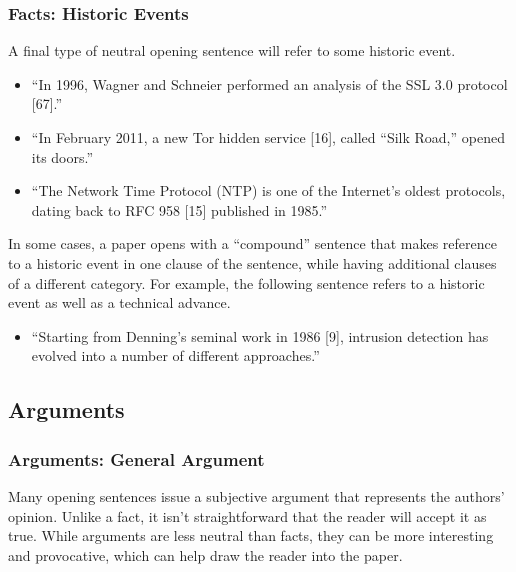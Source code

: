 \documentclass[sigconf,anonymous]{acmart}
\begin{document}
	\subsubsection{Facts: Historic Events}
	
	A final type of neutral opening sentence will refer to some historic event. 
	\begin{itemize} 		
		\item	``In 1996, Wagner and Schneier performed an analysis of the SSL 3.0 protocol [67].''
		
		\item	``In February 2011, a new Tor hidden service [16], called “Silk Road,” opened its doors.''
		
		\item	``The Network Time Protocol (NTP) is one of the Internet’s oldest protocols, dating back to RFC 958 [15] published in 1985.''
	\end{itemize} 		
	In some cases, a paper opens with a “compound” sentence that makes reference to a historic event in one clause of the sentence, while having additional clauses of a different category. For example, the following sentence refers to a historic event as well as a technical advance.
	
	\begin{itemize}
		\item 	``Starting from Denning’s seminal work in 1986 [9], intrusion detection has evolved into a number of different approaches.''
	\end{itemize}	
	
	
	\subsection{Arguments}
	\subsubsection{Arguments: General Argument}
	
	Many opening sentences issue a subjective argument that represents the authors’ opinion. Unlike a fact, it isn’t straightforward that the reader will accept it as true. While arguments are less neutral than facts, they can be more interesting and provocative, which can help draw the reader into the paper.
	
\end{document}
